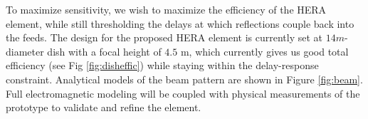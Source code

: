 \documentclass[preprint]{aastex}
\begin{document}
%
%

To maximize sensitivity, we wish to maximize the efficiency of the
HERA element, while still thresholding the delays at which reflections couple
back into the feeds. The design for the proposed HERA element is currently set
at $14m$-diameter dish with a focal height of $4.5$ m, which currently gives us
good total efficiency (see Fig \ref{fig:disheffic}) while staying within the delay-response constraint. 
Analytical models of the beam pattern are shown in Figure \ref{fig:beam}.
Full electromagnetic modeling will be coupled with 
physical measurements of the prototype to validate and refine the element.

\end{document}
